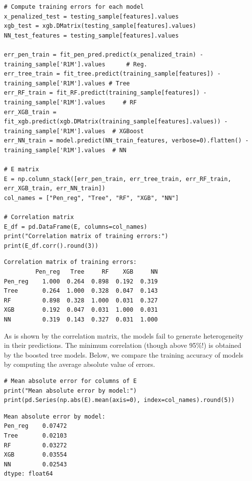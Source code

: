 \begin{verbatim}
# Compute training errors for each model
x_penalized_test = testing_sample[features].values
xgb_test = xgb.DMatrix(testing_sample[features].values)
NN_test_features = testing_sample[features].values

err_pen_train = fit_pen_pred.predict(x_penalized_train) - training_sample['R1M'].values      # Reg.
err_tree_train = fit_tree.predict(training_sample[features]) - training_sample['R1M'].values # Tree
err_RF_train = fit_RF.predict(training_sample[features]) - training_sample['R1M'].values     # RF
err_XGB_train = fit_xgb.predict(xgb.DMatrix(training_sample[features].values)) - training_sample['R1M'].values  # XGBoost
err_NN_train = model.predict(NN_train_features, verbose=0).flatten() - training_sample['R1M'].values  # NN

# E matrix
E = np.column_stack([err_pen_train, err_tree_train, err_RF_train, err_XGB_train, err_NN_train])
col_names = ["Pen_reg", "Tree", "RF", "XGB", "NN"]

# Correlation matrix
E_df = pd.DataFrame(E, columns=col_names)
print("Correlation matrix of training errors:")
print(E_df.corr().round(3))
\end{verbatim}

\begin{verbatim}
Correlation matrix of training errors:
         Pen_reg   Tree     RF    XGB     NN
Pen_reg    1.000  0.264  0.898  0.192  0.319
Tree       0.264  1.000  0.328  0.047  0.143
RF         0.898  0.328  1.000  0.031  0.327
XGB        0.192  0.047  0.031  1.000  0.031
NN         0.319  0.143  0.327  0.031  1.000
\end{verbatim}

As is shown by the correlation matrix, the models fail to generate heterogeneity in their predictions. The minimum correlation (though above 95\%!) is obtained by the boosted tree models. Below, we compare the training accuracy of models by computing the average absolute value of errors.

\begin{verbatim}
# Mean absolute error for columns of E
print("Mean absolute error by model:")
print(pd.Series(np.abs(E).mean(axis=0), index=col_names).round(5))
\end{verbatim}

\begin{verbatim}
Mean absolute error by model:
Pen_reg    0.07472
Tree       0.02103
RF         0.03272
XGB        0.03554
NN         0.02543
dtype: float64
\end{verbatim}

